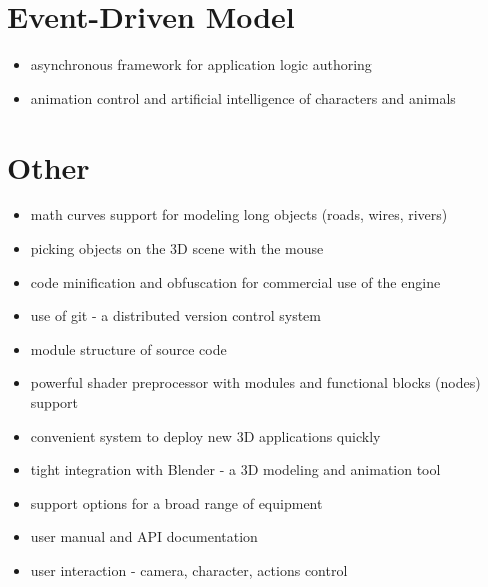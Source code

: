 \documentclass[a4paper,12pt,oneside]{sphinxmanual}
\begin{document}
\section{Event-Driven Model}
\label{features:id13}\begin{itemize}
\item {} 
asynchronous framework for application logic authoring

\item {} 
animation control and artificial intelligence of characters and animals

\end{itemize}


\section{Other}
\label{features:id14}\begin{itemize}
\item {} 
math curves support for modeling long objects (roads, wires, rivers)

\item {} 
picking objects on the 3D scene with the mouse

\item {} 
code minification and obfuscation for commercial use of the engine

\item {} 
use of git - a distributed version control system

\item {} 
module structure of source code

\item {} 
powerful shader preprocessor with modules and functional blocks (nodes) support

\item {} 
convenient system to deploy new 3D applications quickly

\item {} 
tight integration with Blender - a 3D modeling and animation tool

\item {} 
support options for a broad range of equipment

\item {} 
user manual and API documentation

\item {} 
user interaction - camera, character, actions control

\end{itemize}
\end{document}
